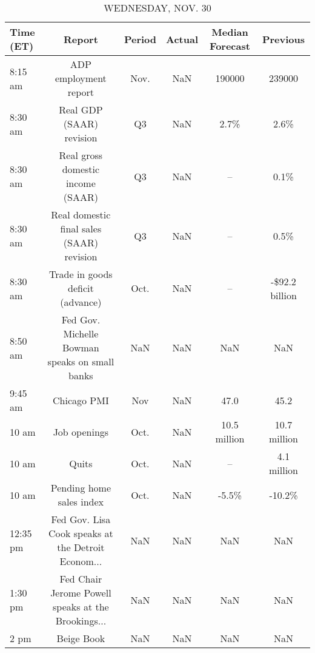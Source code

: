 \documentclass{article}%
\begin{document}
\begin{table}[htbp]%
\caption{WEDNESDAY, NOV. 30}%
\centering%
\begin{adjustbox}{width=1\textwidth}%
\begin{tabular}{lccccc}
\toprule
Time (ET) &                                             Report & Period & Actual & Median Forecast &       Previous \\
\midrule
  8:15 am &                              ADP employment report &   Nov. &    NaN &          190000 &         239000 \\
  8:30 am &                           Real GDP (SAAR) revision &     Q3 &    NaN &            2.7\% &           2.6\% \\
  8:30 am &                  Real gross domestic income (SAAR) &     Q3 &    NaN &              -- &           0.1\% \\
  8:30 am &          Real domestic final sales (SAAR) revision &     Q3 &    NaN &              -- &           0.5\% \\
  8:30 am &                   Trade in goods deficit (advance) &   Oct. &    NaN &              -- & -\$92.2 billion \\
  8:50 am &     Fed Gov. Michelle Bowman speaks on small banks &    NaN &    NaN &             NaN &            NaN \\
  9:45 am &                                        Chicago PMI &    Nov &    NaN &            47.0 &           45.2 \\
    10 am &                                       Job openings &   Oct. &    NaN &    10.5 million &   10.7 million \\
    10 am &                                              Quits &   Oct. &    NaN &              -- &    4.1 million \\
    10 am &                           Pending home sales index &   Oct. &    NaN &           -5.5\% &         -10.2\% \\
 12:35 pm & Fed Gov. Lisa Cook speaks at the Detroit Econom... &    NaN &    NaN &             NaN &            NaN \\
  1:30 pm & Fed Chair Jerome Powell speaks at the Brookings... &    NaN &    NaN &             NaN &            NaN \\
     2 pm &                                         Beige Book &    NaN &    NaN &             NaN &            NaN \\
\bottomrule
\end{tabular}
%
\end{adjustbox}%
\end{table}
\end{document}
